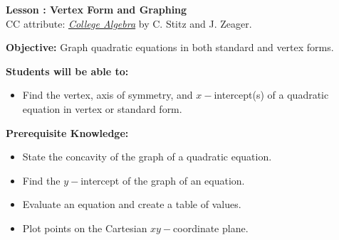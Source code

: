 \documentclass[12pt]{article}
\theoremstyle{definition}
\begin{document}
{\bf \large Lesson : Vertex Form and Graphing}\label{les:vertex_form_and_graphing}
\\ CC attribute: \href{http://www.stitz-zeager.com}{\it{College Algebra}} by C. Stitz and J. Zeager. 
\hfill \doclicenseImage[imagewidth=5em]\\
\par
{\bf Objective:} Graph quadratic equations in both standard and vertex forms.\\
\par
{\bf Students will be able to:}
\begin{itemize}
	\item Find the vertex, axis of symmetry, and $x-$intercept(s) of a quadratic equation in vertex or standard form.
\end{itemize}
{\bf Prerequisite Knowledge:}
\begin{itemize}
	\item State the concavity of the graph of a quadratic equation.
	\item Find the $y-$intercept of the graph of an equation.
	\item Evaluate an equation and create a table of values.
	\item Plot points on the Cartesian $xy-$coordinate plane.
\end{itemize}
\hrulefill
\end{document}
